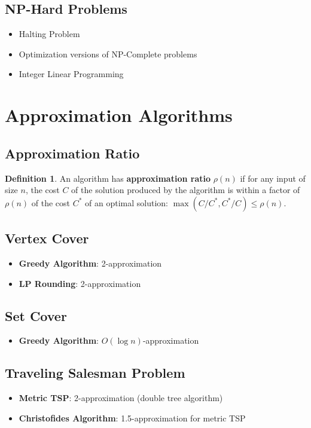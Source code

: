 \documentclass[11pt]{article}
\theoremstyle{definition}
\newtheorem{definition}{Definition}[section]
\begin{document}
\subsection{NP-Hard Problems}
\begin{itemize}
    \item Halting Problem
    \item Optimization versions of NP-Complete problems
    \item Integer Linear Programming
\end{itemize}

\section{Approximation Algorithms}

\subsection{Approximation Ratio}
\begin{definition}
An algorithm has \textbf{approximation ratio} $\rho(n)$ if for any input of size $n$, the cost $C$ of the solution produced by the algorithm is within a factor of $\rho(n)$ of the cost $C^*$ of an optimal solution: $\max(C/C^*, C^*/C) \leq \rho(n)$.
\end{definition}

\subsection{Vertex Cover}
\begin{itemize}
    \item \textbf{Greedy Algorithm}: 2-approximation
    \item \textbf{LP Rounding}: 2-approximation
\end{itemize}

\subsection{Set Cover}
\begin{itemize}
    \item \textbf{Greedy Algorithm}: $O(\log n)$-approximation
\end{itemize}

\subsection{Traveling Salesman Problem}
\begin{itemize}
    \item \textbf{Metric TSP}: 2-approximation (double tree algorithm)
    \item \textbf{Christofides Algorithm}: 1.5-approximation for metric TSP
\end{itemize}
\end{document}
